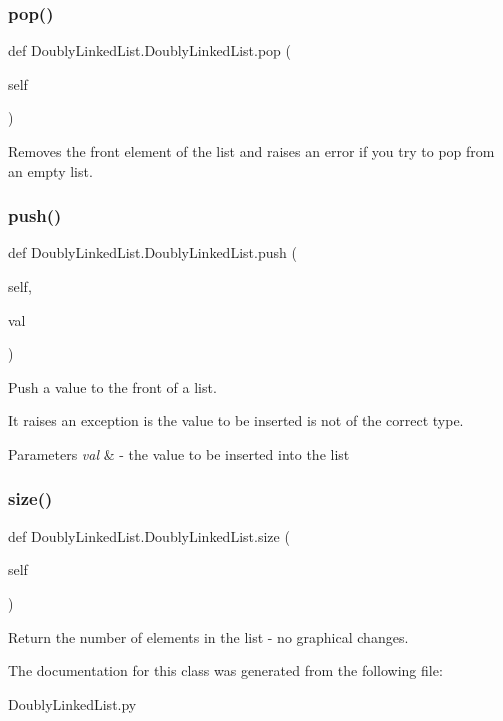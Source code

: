 \subsubsection{\texorpdfstring{pop()}{pop()}}
{\footnotesize\ttfamily def Doubly\+Linked\+List.\+Doubly\+Linked\+List.\+pop (\begin{DoxyParamCaption}\item[{}]{self }\end{DoxyParamCaption})}



Removes the front element of the list and raises an error if you try to pop from an empty list. 

\mbox{\label{class_doubly_linked_list_1_1_doubly_linked_list_ae354e2955360e6c04a9c3af7e3f268a2}} 
\subsubsection{\texorpdfstring{push()}{push()}}
{\footnotesize\ttfamily def Doubly\+Linked\+List.\+Doubly\+Linked\+List.\+push (\begin{DoxyParamCaption}\item[{}]{self,  }\item[{}]{val }\end{DoxyParamCaption})}



Push a value to the front of a list. 

It raises an exception is the value to be inserted is not of the correct type.


\begin{DoxyParams}{Parameters}
{\em val} & -\/ the value to be inserted into the list \\
\hline
\end{DoxyParams}
\mbox{\label{class_doubly_linked_list_1_1_doubly_linked_list_ab37ecd9e19fe37be77120401f6d3cf96}} 
\subsubsection{\texorpdfstring{size()}{size()}}
{\footnotesize\ttfamily def Doubly\+Linked\+List.\+Doubly\+Linked\+List.\+size (\begin{DoxyParamCaption}\item[{}]{self }\end{DoxyParamCaption})}



Return the number of elements in the list -\/ no graphical changes. 



The documentation for this class was generated from the following file\+:\begin{DoxyCompactItemize}
\item 
Doubly\+Linked\+List.\+py\end{DoxyCompactItemize}
